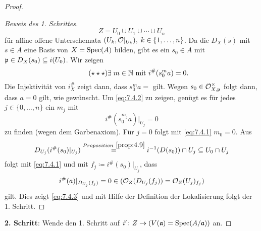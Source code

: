 \begin{thm}
\begin{proof}
\begin{proof}[Beweis des 1. Schrittes]
			\[
				Z = U_0 \cup U_1 \cup \cdots \cup U_n
			\]
			für affine offene Unterschemata $(U_k,\mathcal{O}\vert_{U_k}),\; k \in \{1,\ldots,n\}$. Da die $D_X(s)$ mit $s \in A$ eine Basis von $X = \operatorname{Spec}(A)$ bilden, gibt es ein $s_0\in A$ mit $\mathfrak{p} \in D_X(s_0) \subseteq i(U_0)$. Wir zeigen
			\begin{equation*}
			\label{eq:7.4.2}\tag{$\star\star\star$}
				\exists\; m \in \mathbb {N} \text{ mit } i^{\#}(s_0^ma) = 0.
			\end{equation*}
			Die Injektivität von $i^{\#}_X$ zeigt dann, dass $s_0^ma =$ gilt. Wegen $s_0\in \mathcal{O}_{X,\mathfrak{p}}^\times$ folgt dann, dass $a = 0$ gilt, wie gewünscht. Um \eqref{eq:7.4.2} zu zeigen, genügt es für jedes $j \in \{0,\ldots,n\}$ ein $m_j$ mit
			\begin{equation*}
			\label{eq:7.4.3}\tag{$\star\star\star\star$}
				i^{\#}(s_0^{m_j}a)\vert_{U_j} = 0
			\end{equation*}
			zu finden (wegen dem Garbenaxiom). Für $j=0$ folgt mit \eqref{eq:7.4.1} $m_0=0$. Aus
			\[
				D_{U_j}(i^{\#}(s_0)\vert_{U_j}) \overset{Proposition~\ref{prop:4.9}}{=} i^{-1}(D(s_0)) \cap U_j \subseteq U_0 \cap U_j
			\]
			folgt mit \eqref{eq:7.4.1} und mit $f_j \coloneqq i^{\#}(s_0)\vert_{U_j}$, dass
			\[
				i^{\#}(a)\vert_{D_{U_j}(f_j)} = 0 \in (\mathcal{O}_Z(D_{U_j}(f_j)) = \mathcal{O}_Z(U_j)_{f_j})
			\]
			gilt. Dies zeigt \eqref{eq:7.4.3} und mit Hilfe der Definition der Lokalisierung folgt der 1. Schritt.
		\end{proof}
		\textbf{2. Schritt}: Wende den 1. Schritt auf $i'\colon Z \to (V(\mathfrak{a}) = \operatorname{Spec}(A/\mathfrak{a}))$ an.
	\end{proof}
\end{thm}

